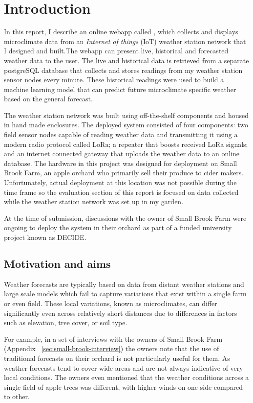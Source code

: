 \section{Introduction}

In this report, I describe an online webapp called \myReportTitle{}, which
collects and displays microclimate data from an \emph{Internet of things} (IoT)
weather station network that I designed and built.The webapp can present live,
historical and forecasted weather data to the user. The live and historical data
is retrieved from a separate postgreSQL database that collects and stores
readings from my weather station sensor nodes every minute. These historical
readings were used to build a machine learning model that can predict future
microclimate specific weather based on the general forecast.

The weather station network was built using off-the-shelf components and housed
in hand made enclosures. The deployed system consisted of four components: two
field sensor nodes capable of reading weather data and transmitting it using a
modern radio protocol called LoRa; a repeater that boosts received LoRa signals;
and an internet connected gateway that uploads the weather data to an online
database. The hardware in this project was designed for deployment on Small
Brook Farm, an apple orchard who primarily sell their produce to cider makers.
Unfortunately, actual deployment at this location was not possible during the
time frame so the evaluation section of this report is focused on data collected
while the weather station network was set up in my garden. 

At the time of submission, discussions with the owner of Small Brook Farm were
ongoing to deploy the system in their orchard as part of a funded university
project known as DECIDE.

\subsection{Motivation and aims}

Weather forecasts are typically based on data from distant weather stations and
large scale models which fail to capture variations that exist within a single
farm or even field. These local variations, known as microclimates, can differ
significantly even across relatively short distances due to differences in
factors such as elevation, tree cover, or soil type. 

For example, in a set of interviews with the owners of Small Brook Farm
(Appendix ~\ref{sec:small-brook-interview}) the owners note that the use of
traditional forecasts on their orchard is not particularly useful for them. As
weather forecasts tend to cover wide areas and are not always indicative of very
local conditions. The owners even mentioned that the weather conditions across a
single field of apple trees was different, with higher winds on one side
compared to other. 

